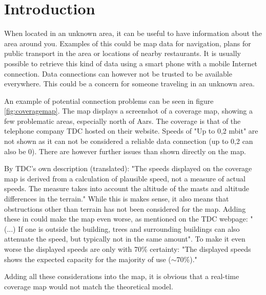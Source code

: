 \chapter{Introduction}
\label{chap:intro}

When located in an unknown area, it can be useful to have information about the area around you. Examples of this could be map data for navigation, plans for public transport in the area or locations of nearby restaurants. It is usually possible to retrieve this kind of data using a smart phone with a mobile Internet connection. Data connections can however not be trusted to be available everywhere. This could be a concern for someone traveling in an unknown area.

An example of potential connection problems can be seen in figure \ref{fig:coveragemap}.
The map displays a screenshot of a coverage map, showing a few problematic areas, especially north of Aars. The coverage is that of the telephone company TDC hosted on their website\cite{tdccoverage}. Speeds of "Up to 0,2 mbit" are not shown as it can not be considered a reliable data connection (up to 0,2 can also be 0). There are however further issues than shown directly on the map.

By TDC's own description (translated): "The speeds displayed on the coverage map is derived from a calculation of plausible speed, not a measure of actual speeds. The measure takes into account the altitude of the masts and altitude differences in the terrain."
While this is makes sense, it also means that obstructions other than terrain has not been considered for the map. Adding these in could make the map even worse, as mentioned on the TDC webpage: "(...) If one is outside the building, trees and surrounding buildings can also attenuate the speed, but typically not in the same amount".
To make it even worse the displayed speeds are only with 70\% certainty: "The displayed speeds shows the expected capacity for the majority of use ($\sim$70\%)."

Adding all these considerations into the map, it is obvious that a real-time coverage map would not match the theoretical model. 

